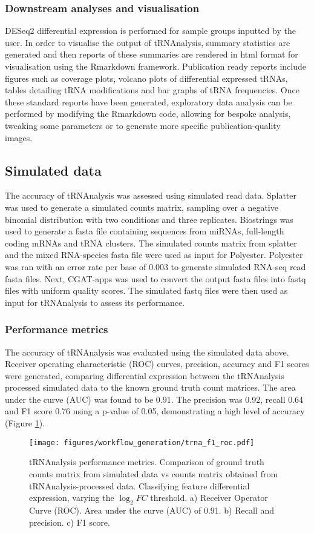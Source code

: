 \subsubsection{Downstream analyses and visualisation}
DESeq2 differential expression is performed for sample groups inputted by the user.
In order to visualise the output of tRNAnalysis, summary statistics are generated and then reports of these summaries are rendered in html format for visualisation using the Rmarkdown framework.
Publication ready reports include figures such as coverage plots, volcano plots of differential expressed tRNAs, tables detailing tRNA modifications and bar graphs of tRNA frequencies.
Once these standard reports have been generated, exploratory data analysis can be performed by modifying the Rmarkdown code, allowing for bespoke analysis, tweaking some parameters or to generate more specific publication-quality images.

\subsection{Simulated data}
The accuracy of tRNAnalysis was assessed using simulated read data.
Splatter\cite{zappia2017splatter} was used to generate a simulated counts matrix, sampling over a negative binomial distribution with two conditions and three replicates.
Biostrings\cite{pages2013package} was used to generate a fasta file containing sequences from miRNAs, full-length coding mRNAs and tRNA clusters.
The simulated counts matrix from splatter and the mixed RNA-species fasta file were used as input for Polyester\cite{frazee2015polyester}.
Polyester was ran with an error rate per base of 0.003 to generate simulated RNA-seq read fasta files.
Next, CGAT-apps\cite{sims2014cgat} was used to convert the output fasta files into fastq files with uniform quality scores.
The simulated fastq files were then used as input for tRNAnalysis to assess its performance.

\subsubsection{Performance metrics}
The accuracy of tRNAnalysis was evaluated using the simulated data above.
Receiver operating characteristic (ROC) curves, precision, accuracy and F1 scores were generated, comparing differential expression between the tRNAnalysis processed simulated data to the known ground truth count matrices.
The area under the curve (AUC) was found to be 0.91.
The precision was 0.92, recall 0.64 and F1 score 0.76 using a p-value of 0.05, demonstrating a high level of accuracy (Figure \ref{fig:trna_f1_roc}).

\begin{figure}[htb]
\centering
\texttt{[image: figures/workflow\_generation/trna\_f1\_roc.pdf]}
\caption[tRNAnalysis performance metrics]{tRNAnalysis performance metrics.
Comparison of ground truth counts matrix from simulated data vs counts matrix obtained from tRNAnalysis-processed data.
Classifying feature differential expression, varying the $\log_{2}FC$ threshold.
a) Receiver Operator Curve (ROC).
Area under the curve (AUC)  of 0.91.
b) Recall and precision.
c) F1 score.}
\label{fig:trna_f1_roc}
\end{figure}